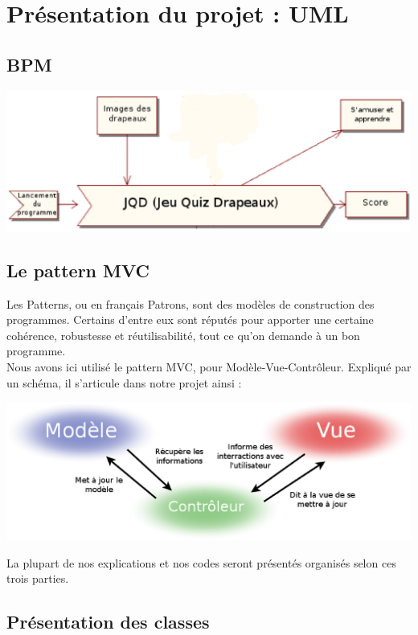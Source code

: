 \documentclass{article}
\begin{document}
\newpage
\section{Présentation du projet : UML}
\subsection{BPM}
\begin{center}\includegraphics[scale=0.7]{BPM.eps}\end{center}

\subsection{Le pattern MVC}
Les Patterns, ou en français Patrons, sont des modèles de construction des programmes. Certains d'entre eux sont réputés pour apporter une certaine cohérence, robustesse et réutilisabilité, tout ce qu'on demande à un bon programme.\\
Nous avons ici utilisé le pattern MVC, pour Modèle-Vue-Contrôleur. Expliqué par un schéma, il s'articule dans notre projet ainsi :

\begin{center}\includegraphics[scale=0.5]{MVC.eps}\end{center}

La plupart de nos explications et nos codes seront présentés organisés selon ces trois parties.

\subsection{Présentation des classes}
\end{document}

